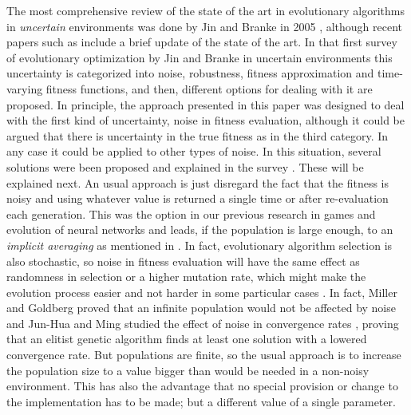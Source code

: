 \documentclass{llncs}
\begin{document}
The most comprehensive review of the state of the art in evolutionary
algorithms in {\em uncertain} environments 
was done by Jin and Branke in 2005 \cite{Jin2005303}, although recent papers such as \cite{DBLP:journals/corr/QianYZ13} include a brief update of the state
of the art. In that first survey 
of evolutionary optimization by Jin and Branke  in
uncertain environments this uncertainty is categorized into noise,
robustness, fitness approximation and time-varying fitness functions, and then,
different options for dealing with it are proposed. In principle, the
approach presented in this paper was designed to deal with the first kind of
uncertainty, noise in fitness evaluation, although it could be argued
that there is uncertainty in the true fitness as in the third
category. In any case it could be applied to
other types of noise. In this situation, several solutions were been
proposed and explained in the survey \cite{Jin2005303}. These will be
explained next.
An usual approach is just disregard the fact that the fitness is
noisy and using whatever value is returned a single time or after
re-evaluation each generation. 
This was the option in our
previous research in games and evolution of neural networks \cite{castilloGECCO99,bots:evostar,merelo:ESNN} and leads, if
the population is large enough, to an {\em implicit averaging} as
mentioned in \cite{Jin2005303}. In fact, evolutionary algorithm
selection is also stochastic, so noise in fitness evaluation
will have the same effect as randomness in selection or a higher mutation
rate, which might make the evolution process easier and not harder
in some particular cases
\cite{DBLP:journals/corr/QianYZ13}. 
In fact, Miller and Goldberg proved that an infinite population would not
be affected by noise \cite{miller1996genetic} and Jun-Hua and Ming studied the
effect of noise in convergence rates \cite{Junhua20136780}, proving
that an elitist genetic algorithm finds at least one solution with a lowered
convergence rate. But populations are finite, so the usual approach is to increase the population size to a value bigger than would be needed in a non-noisy environment. 
This has also the advantage that no special provision or change to the
implementation has to be made; but a different value of a single parameter.
\end{document}
